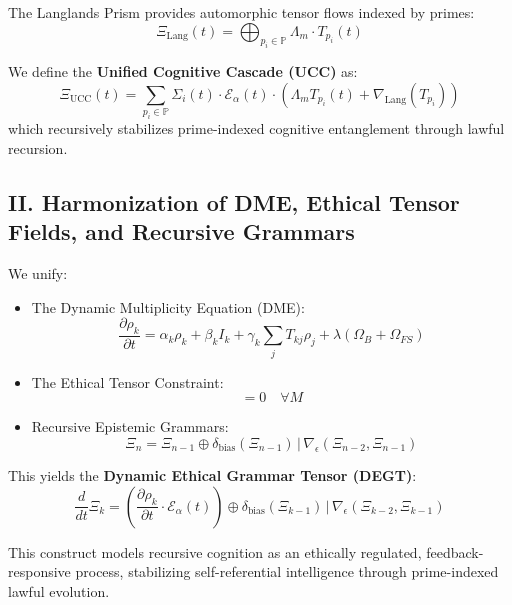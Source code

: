 \documentclass[12pt]{article}
\begin{document}
The Langlands Prism provides automorphic tensor flows indexed by primes:
\begin{equation}
\Xi_{\text{Lang}}(t) = \bigoplus_{p_i \in \mathbb{P}} \Lambda_m \cdot T_{p_i}(t)
\end{equation}

We define the \textbf{Unified Cognitive Cascade (UCC)} as:
\begin{equation}
\Xi_{\text{UCC}}(t) = \sum_{p_i \in \mathbb{P}} \Sigma_i(t) \cdot \mathcal{E}_\alpha(t) \cdot \left(\Lambda_m T_{p_i}(t) + \nabla_{\text{Lang}}(T_{p_i})\right)
\end{equation}
which recursively stabilizes prime-indexed cognitive entanglement through lawful recursion.

\subsection{II. Harmonization of DME, Ethical Tensor Fields, and Recursive Grammars}

We unify:
\begin{itemize}
    \item The Dynamic Multiplicity Equation (DME):
    \begin{equation}
    \frac{\partial \rho_k}{\partial t} = \alpha_k \rho_k + \beta_k I_k + \gamma_k \sum_j T_{kj} \rho_j + \lambda (\Omega_B + \Omega_{FS})
    \end{equation}
    \item The Ethical Tensor Constraint:
    \begin{equation}
    [M, \mathcal{E}_\alpha(t)] = 0 \quad \forall M
    \end{equation}
    \item Recursive Epistemic Grammars:
    \begin{equation}
    \Xi_n = \Xi_{n-1} \oplus \delta_{\text{bias}}(\Xi_{n-1}) \,|\, \nabla_\epsilon(\Xi_{n-2}, \Xi_{n-1})
    \end{equation}
\end{itemize}

This yields the \textbf{Dynamic Ethical Grammar Tensor (DEGT)}:
\begin{equation}
\frac{d}{dt}\Xi_k = \left(\frac{\partial \rho_k}{\partial t} \cdot \mathcal{E}_\alpha(t)\right) \oplus \delta_{\text{bias}}(\Xi_{k-1}) \,|\, \nabla_\epsilon(\Xi_{k-2}, \Xi_{k-1})
\end{equation}

This construct models recursive cognition as an ethically regulated, feedback-responsive process, stabilizing self-referential intelligence through prime-indexed lawful evolution.
\end{document}
